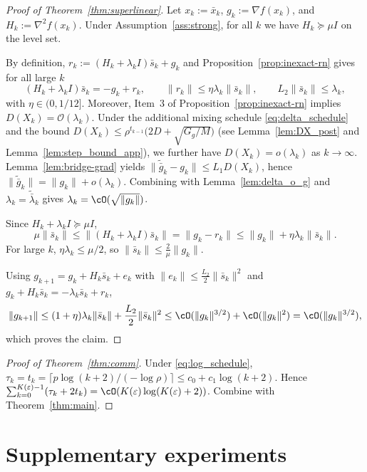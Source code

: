 \documentclass[review,onefignum,onetabnum]{siamart171218}
\begin{document}
	\begin{proof}[Proof of Theorem~\ref{thm:superlinear}]
		Let $x_k:=\bar x_k$, $g_k:=\nabla f(x_k)$, and $H_k:=\nabla^2 f(x_k)$.
		Under Assumption~\ref{ass:strong}, for all $k$ we have $H_k\succeq \mu I$ on the level set.
		
		By definition, $r_k:=(H_k+\lambda_k I)\bar s_k+g_k$ and Proposition~\ref{prop:inexact-rn} gives for all large $k$
		\[
		(H_k+\lambda_k I)\bar s_k=-g_k+r_k,\qquad \|r_k\|\le \eta\lambda_k\|\bar s_k\|,\qquad L_2\|\bar s_k\|\le \lambda_k,
		\]
		with $\eta\in(0,1/12]$. Moreover, Item~3 of Proposition~\ref{prop:inexact-rn} implies $D(X_k)=\mathcal O(\lambda_k)$.
		Under the additional mixing schedule \eqref{eq:delta_schedule} and the bound
		$D(X_k)\le \rho^{t_{k-1}}\big(2D+\sqrt{G_g/M}\big)$ (see Lemma~\ref{lem:DX_post} and Lemma~\ref{lem:step_bound_app}),
		we further have $D(X_k)=o(\lambda_k)$ as $k\to\infty$.
		Lemma~\ref{lem:bridge-grad} yields
		$\|\tilde{\bar g}_k-g_k\|\le L_1D(X_k)$, hence $\|\tilde{\bar g}_k\|=\|g_k\|+o(\lambda_k)$.
		Combining with Lemma~\ref{lem:delta_o_g} and $\lambda_k=\tilde{\bar\lambda}_k$ gives $\lambda_k=\cO(\sqrt{\|g_k\|})$.
		
		Since $H_k+\lambda_k I\succeq \mu I$,
		\[
		\mu\|\bar s_k\|\le \|(H_k+\lambda_k I)\bar s_k\|=\|g_k-r_k\|\le \|g_k\|+\eta\lambda_k\|\bar s_k\|.
		\]
		For large $k$, $\eta\lambda_k\le \mu/2$, so $\|\bar s_k\|\le \frac{2}{\mu}\|g_k\|$.
		
		Using $g_{k+1}=g_k+H_k\bar s_k+e_k$ with $\|e_k\|\le \frac{L_2}{2}\|\bar s_k\|^2$ and $g_k+H_k\bar s_k=-\lambda_k\bar s_k+r_k$,
		\[
		\|g_{k+1}\|\le (1+\eta)\lambda_k\|\bar s_k\|+\frac{L_2}{2}\|\bar s_k\|^2
		\le \cO(\|g_k\|^{3/2})+\cO(\|g_k\|^2)=\cO(\|g_k\|^{3/2}),
		\]
		which proves the claim.
	\end{proof}
	
	
	
	\begin{proof}[Proof of Theorem~\ref{thm:comm}]
		Under \eqref{eq:log_schedule}, $\tau_k=t_k=\lceil p\log(k+2)/(-\log\rho)\rceil\le c_0+c_1\log(k+2)$.
		Hence $\sum_{k=0}^{K(\varepsilon)-1}(\tau_k+2t_k)=\cO(K(\varepsilon)\log(K(\varepsilon)+2))$.
		Combine with Theorem~\ref{thm:main}.
	\end{proof}
	
	\section{Supplementary experiments}\label{app:supp_exp}
	
\end{document}
